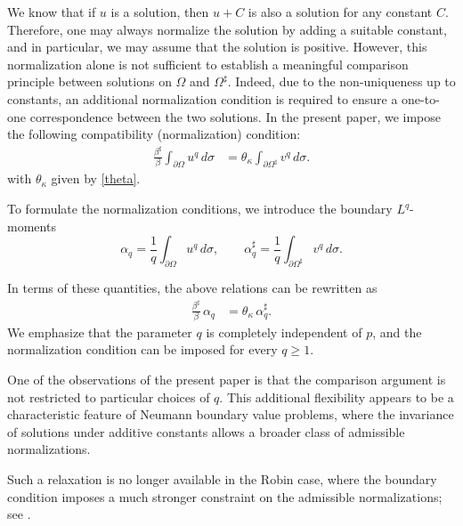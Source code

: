 \documentclass[11pt]{article}
\numberwithin{equation}{section}
\theoremstyle{definition}
\theoremstyle{remark}
\begin{document}
We know that if $u$ is a solution, then $u+C$ is also a solution for any constant $C$. 
Therefore, one may always normalize the solution by adding a suitable constant, and in particular, 
we may assume that the solution is positive.
However, this normalization alone is not sufficient to establish a meaningful comparison principle between solutions on $\Omega$ and $\Omega^\sharp$. 
Indeed, due to the non-uniqueness up to constants, an additional normalization condition is required to ensure a one-to-one correspondence between the two solutions.
In the present paper, we impose the following compatibility (normalization) condition:
\begin{align}
\frac{\beta^\sharp}{\beta}
\int_{\partial\Omega}
u^q\,d\sigma
&=
\theta_\kappa
\int_{\partial\Omega^\sharp}
v^q\,d\sigma.
\label{eq:1.6}
\end{align}
with $\theta_\kappa$ given by \eqref{theta}.

To formulate the normalization conditions, we introduce the boundary $L^q$-moments
\[
\alpha_q
=
\frac{1}{q}
\int_{\partial\Omega}
u^q\,d\sigma,
\qquad
\alpha_q^\sharp
=
\frac{1}{q}
\int_{\partial\Omega^\sharp}
v^q\,d\sigma.
\]

In terms of these quantities, the above relations can be rewritten as
\begin{align}\label{eq:1.7}
\frac{\beta^\sharp}{\beta}\,\alpha_q
&=
\theta_\kappa\,\alpha_q^\sharp.
\end{align}
We emphasize that the parameter $q$ is completely independent of $p$, 
and the normalization condition can be imposed for every $q\ge 1$. 

One of the observations of the present paper is that the comparison argument is not restricted to particular choices of $q$. 
This additional flexibility appears to be a characteristic feature of Neumann boundary value problems, 
where the invariance of solutions under additive constants allows a broader class of admissible normalizations.

Such a relaxation is no longer available in the Robin case, 
where the boundary condition imposes a much stronger constraint on the admissible normalizations; see \cite{amato2022comparison}.
\end{document}
